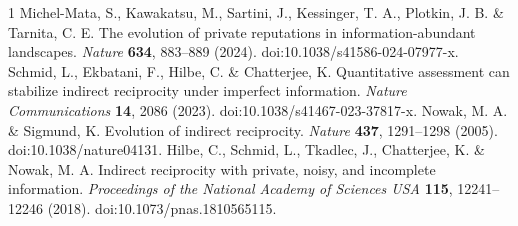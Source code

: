 \documentclass[fleqn,10pt]{wlscirep}
\begin{document}
\begin{thebibliography}{1}
Michel-Mata, S., Kawakatsu, M., Sartini, J., Kessinger, T. A., Plotkin, J. B. \& Tarnita, C. E. The evolution of private reputations in information-abundant landscapes. \textit{Nature} \textbf{634}, 883--889 (2024). doi:10.1038/s41586-024-07977-x.
Schmid, L., Ekbatani, F., Hilbe, C. \& Chatterjee, K. Quantitative assessment can stabilize indirect reciprocity under imperfect information. \textit{Nature Communications} \textbf{14}, 2086 (2023). doi:10.1038/s41467-023-37817-x.
Nowak, M. A. \& Sigmund, K. Evolution of indirect reciprocity. \textit{Nature} \textbf{437}, 1291--1298 (2005). doi:10.1038/nature04131.
Hilbe, C., Schmid, L., Tkadlec, J., Chatterjee, K. \& Nowak, M. A. Indirect reciprocity with private, noisy, and incomplete information. \textit{Proceedings of the National Academy of Sciences USA} \textbf{115}, 12241--12246 (2018). doi:10.1073/pnas.1810565115.
\end{thebibliography}
\end{document}
